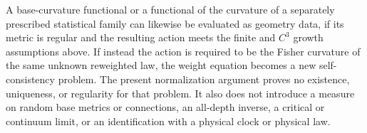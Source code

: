 A base-curvature functional or a functional of the curvature of a
separately prescribed statistical family can likewise be evaluated as
geometry data, if its metric is regular and the resulting action meets
the finite and $C^3$ growth assumptions above. If instead the action is
required to be the Fisher curvature of the same unknown reweighted law,
the weight equation becomes a new self-consistency problem. The present
normalization argument proves no existence, uniqueness, or regularity
for that problem. It also does not introduce a measure on random base
metrics or connections, an all-depth inverse, a critical or continuum
limit, or an identification with a physical clock or physical law.\thermoestablishedstatus


\endgroup
